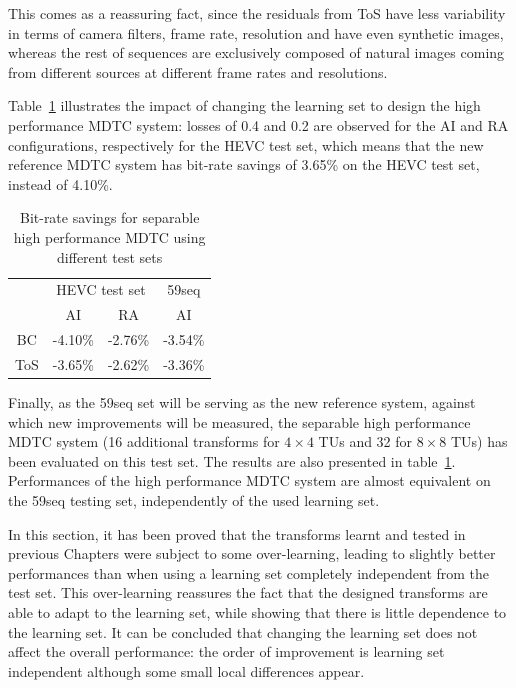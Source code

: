 \documentclass[11pt,a4paper,openright,twoside]{book}
\numberwithin{equation}{section} %
\numberwithin{figure}{section} %
\numberwithin{table}{section} %
\begin{document}
This comes as a reassuring fact, since the residuals from ToS have less
variability in terms of camera filters, frame rate, resolution and have even
synthetic images, whereas the rest of sequences are exclusively composed of
natural images coming from different sources at different frame rates and
resolutions.

Table~\ref{tab:cross_bdrate_learn} illustrates the impact of changing the
learning set to design the high performance \ac{MDTC} system: losses of 0.4
and 0.2 are observed for the \ac{AI} and \ac{RA} configurations, respectively
for the \ac{HEVC} test set, which means that the new reference \ac{MDTC}
system has bit-rate savings of 3.65\% on the \ac{HEVC} test set, instead of
4.10\%.

\begin{table}[tb]
	\centering
	\small
	\begin{tabular}{c|cc|c}
		& \multicolumn{2}{c|}{\acs{HEVC} test set} & 59seq \\
		\diagbox{Learn}{Test}
		& \acs{AI} & \acs{RA} & \acs{AI} \\
		\hline\hline
		BC  & -4.10\% & -2.76\% & -3.54\% \\
		ToS & -3.65\% & -2.62\% & -3.36\% \\
	\end{tabular}
	\caption{Bit-rate savings for separable high performance \acs{MDTC} using
	different test sets}
	\label{tab:cross_bdrate_learn}
\end{table}

Finally, as the 59seq set will be serving as the new reference system, against
which new improvements will be measured, the separable high performance
\ac{MDTC} system (16 additional transforms for $4\times4$ \acp{TU} and 32 for
$8\times8$ \acp{TU}) has been evaluated on this test set.
The results are also presented in table~\ref{tab:cross_bdrate_learn}.
Performances of the high performance \ac{MDTC} system are almost equivalent on
the 59seq testing set, independently of the used learning set.

In this section, it has been proved that the transforms learnt and tested in
previous Chapters were subject to some over-learning, leading to slightly
better performances than when using a learning set completely independent from
the test set.
This over-learning reassures the fact that the designed transforms are able to
adapt to the learning set, while showing that there is little dependence to
the learning set.
It can be concluded that changing the learning set does not affect
the overall performance:
the order of improvement is learning set independent although some small local
differences appear.
\end{document}
